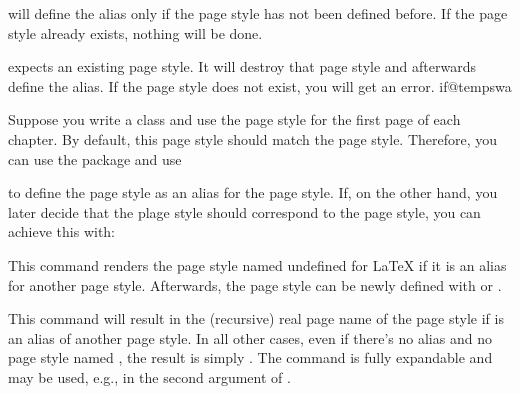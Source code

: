  will define the alias only if the
 page style has not been defined before. If the
 page style already exists, nothing will be done.

 expects an existing
 page style. It will destroy that page style and
afterwards define the alias. If the  page style
does not exist, you will get an error.%
%
\csname if@tempswa\endcsname%
  \begin{Example}
    Suppose you write a class and use the  page style for the
    first page of each chapter. By default, this page style should match the
     page style. Therefore, you can use the 
    package and use
\begin{lstcode}
\end{lstcode}
    to define the  page style as an alias for the
     page style. If, on the other hand, you later decide that
    the  plage style should correspond to the
     page style, you can achieve this with:
\begin{lstcode}
\end{lstcode}%
  \end{Example}%
\fi
\EndIndexGroup


\begin{Declaration}
\end{Declaration}
%
%
This command renders the page style named  undefined
for \LaTeX{} if it is an alias for another page style. Afterwards, the page
style can be newly defined with
 or
.%
\EndIndexGroup


\begin{Declaration}
\end{Declaration}
%
%
This command will result in the (recursive) real page name of the page style
if  is an alias of another page style. In all other
cases, even if there's no alias and no page style named , the result is simply . The command is fully
expandable and may be used, e.g., in the second argument of .%
\EndIndexGroup


